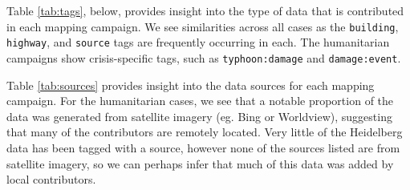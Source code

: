 Table \ref{tab:tags}, below, provides insight into the type of data that is contributed in each mapping campaign. We see similarities across all cases as the \texttt{building}, \texttt{highway}, and \texttt{source} tags are frequently occurring in each. The humanitarian campaigns show crisis-specific tags, such as \texttt{typhoon:damage} and \texttt{damage:event}.  

Table \ref{tab:sources} provides insight into the data sources for each mapping campaign. For the humanitarian cases, we see that a notable proportion of the data was generated from satellite imagery (eg. Bing or Worldview), suggesting that many of the contributors are remotely located. Very little of the Heidelberg data has been tagged with a source, however none of the sources listed are from satellite imagery, so we can perhaps infer that much of this data was added by local contributors. 

